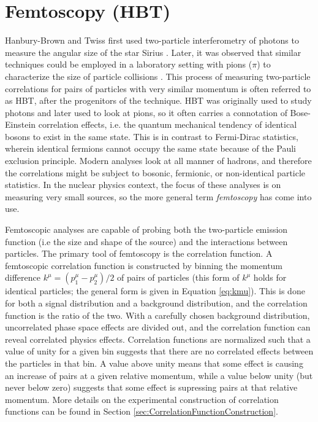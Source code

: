 \section{Femtoscopy (HBT)}
\label{sec:FemtoHBT}
Hanbury-Brown and Twiss first used two-particle interferometry of photons to measure the angular size of the star Sirius \cite{HanburyBrown:1956bqd}.
Later, it was observed that similar techniques could be employed in a laboratory setting with pions ($\pi$) to characterize the size of particle collisions \cite{Goldhaber:1960sf}.
This process of measuring two-particle correlations for pairs of particles with very similar momentum is often referred to as HBT, after the progenitors of the technique.
HBT was originally used to study photons and later used to look at pions, so it often carries a connotation of Bose-Einstein correlation effects, i.e. the quantum mechanical tendency of identical bosons to exist in the same state. This is in contrast to Fermi-Dirac statistics, wherein identical fermions cannot occupy the same state because of the Pauli exclusion principle.
Modern analyses look at all manner of hadrons, and therefore the correlations might be subject to bosonic, fermionic, or non-identical particle statistics.
In the nuclear physics context, the focus of these analyses is on measuring very small sources, so the more general term \textit{femtoscopy} has come into use.


Femtoscopic analyses are capable of probing both the two-particle emission function (i.e the size and shape of the source) and the interactions between particles. 
The primary tool of femtoscopy is the correlation function.
A femtoscopic correlation function is constructed by binning the momentum difference $k^\mu = (p_1^\mu - p_2^\mu)/2$ of pairs of particles (this form of $k^\mu$ holds for identical particles; the general form is given in Equation \ref{eq:kmu}).
This is done for both a signal distribution and a background distribution, and the correlation function is the ratio of the two.
With a carefully chosen background distribution, uncorrelated phase space effects are divided out, and the correlation function can reveal correlated physics effects.
Correlation functions are normalized such that a value of unity for a given bin suggests that there are no correlated effects between the particles in that bin.
A value above unity means that some effect is causing an increase of pairs at a given relative momentum, while a value below unity (but never below zero) suggests that some effect is supressing pairs at that relative momentum.
More details on the experimental construction of correlation functions can be found in Section \ref{sec:CorrelationFunctionConstruction}.

